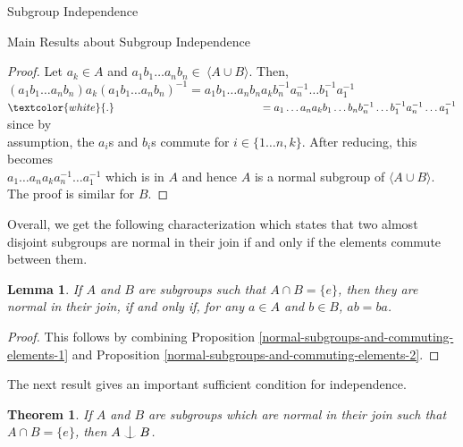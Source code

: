 \documentclass{article}
\newtheorem{theorem}{Theorem}[section]
\newtheorem{lemma}{Lemma}[section]
\def\indep{\mathrel{\raise0.2ex\hbox{\ooalign{\hidewidth$\vert$\hidewidth\cr\raise-0.9ex\hbox{$\smile$}}}}}
\begin{document}
\begin{section}{Subgroup Independence}
\begin{subsection}{Main Results about Subgroup Independence}
			\begin{proof}
				Let $a_k \in A$ and $a_1b_1 \dots a_nb_n \in \ \langle A \cup B\rangle $. Then, \\ $(a_1b_1 \dots a_nb_n)a_k(a_1b_1 \dots a_nb_n)^{-1} = a_1b_1 \dots a_nb_n a_k b_n^{-1} a_n^{-1} \dots b_1^{-1}a_1^{-1}$ \\ $ \textcolor{white}{.} \ \ \ \ \ \ \ \ \ \ \ \ \ \ \ \ \ \ \ \ \ \ \ \ \ \ \ \ \ \ \ \ \ \ \ \ \ \ \ \ \ = a_1 \dots a_n a_k b_1 \dots b_n b_n^{-1} \dots b_1^{-1} a_n^{-1} \dots a_1^{-1}$  since by \\  assumption, the $a_i$s and $b_i$s commute for $ i \in \{1 \dots n, k\}$. After reducing, this becomes \\ $a_1 \dots a_n a_k a_n^{-1} \dots a_1^{-1}$ which is in $A$ and hence $A$ is a normal subgroup of $\langle A \cup B\rangle $. The proof is similar for $B$.
			\end{proof}
			
			\noindent Overall, we get the following characterization which states that two almost disjoint subgroups are normal in their join if and only if the elements commute between them.
			
			\begin{lemma}\label{normalsCommute}
				If $A$ and $B$ are subgroups such that $A \cap B = \{e\}$, then they are normal in their join, if and only if, for any $a \in A$ and $b \in B$, $ab =ba$.
			\end{lemma}
			
			\begin{proof}
				
				This follows by combining Proposition \ref{normal-subgroups-and-commuting-elements-1} and Proposition \ref{normal-subgroups-and-commuting-elements-2}.
			\end{proof}
			
			\noindent The next result gives an important sufficient condition for independence.
			
			\begin{theorem}\label{normalTheorem}
				If $A$ and $B$ are subgroups which are normal in their join such that $A \cap B = \{e\}$, then $ A \indep B$.
			\end{theorem}
			

\end{subsection}
\end{section}
\end{document}
